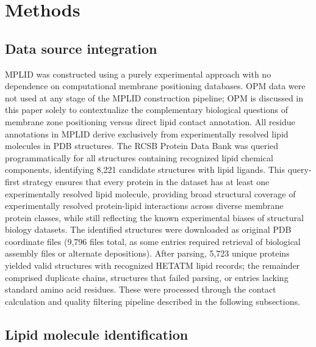 \documentclass[unnumsec,webpdf,contemporary,large]{oup-authoring-template}
\begin{document}
\section{Methods}

\subsection{Data source integration}

MPLID was constructed using a purely experimental approach with no dependence on computational membrane positioning databases. OPM data were not used at any stage of the MPLID construction pipeline; OPM is discussed in this paper solely to contextualize the complementary biological questions of membrane zone positioning versus direct lipid contact annotation. All residue annotations in MPLID derive exclusively from experimentally resolved lipid molecules in PDB structures. The RCSB Protein Data Bank \cite{berman2000, burley2023} was queried programmatically for all structures containing recognized lipid chemical components, identifying 8,221 candidate structures with lipid ligands. This query-first strategy ensures that every protein in the dataset has at least one experimentally resolved lipid molecule, providing broad structural coverage of experimentally resolved protein-lipid interactions across diverse membrane protein classes, while still reflecting the known experimental biases of structural biology datasets. The identified structures were downloaded as original PDB coordinate files (9,796 files total, as some entries required retrieval of biological assembly files or alternate depositions). After parsing, 5,723 unique proteins yielded valid structures with recognized HETATM lipid records; the remainder comprised duplicate chains, structures that failed parsing, or entries lacking standard amino acid residues. These were processed through the contact calculation and quality filtering pipeline described in the following subsections.

\subsection{Lipid molecule identification}
\end{document}
